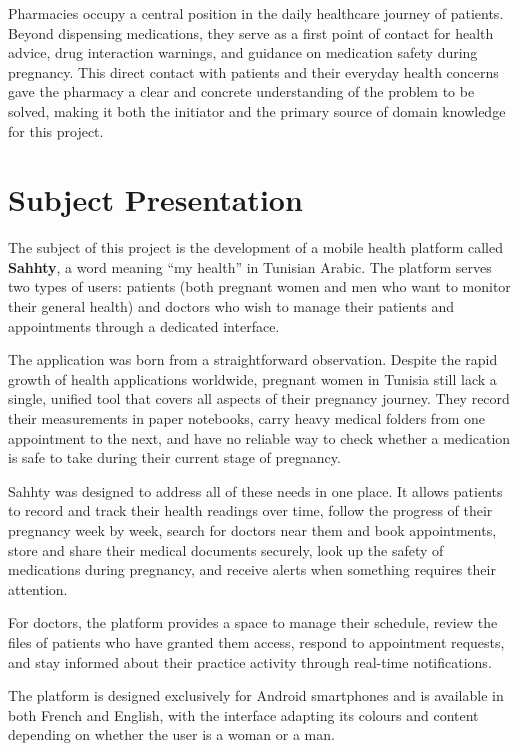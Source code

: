 Pharmacies occupy a central position in the daily healthcare journey of patients. Beyond
dispensing medications, they serve as a first point of contact for health advice, drug
interaction warnings, and guidance on medication safety during pregnancy. This direct
contact with patients and their everyday health concerns gave the pharmacy a clear and
concrete understanding of the problem to be solved, making it both the initiator and the
primary source of domain knowledge for this project.



\section{Subject Presentation}

The subject of this project is the development of a mobile health platform
called \textbf{Sahhty}, a word meaning ``my health'' in Tunisian Arabic. The platform
serves two types of users: patients (both pregnant women and men who want to monitor
their general health) and doctors who wish to manage their patients and appointments
through a dedicated interface.

The application was born from a straightforward observation. Despite the rapid growth of
health applications worldwide, pregnant women in Tunisia still lack a single, unified tool
that covers all aspects of their pregnancy journey. They record their measurements in
paper notebooks, carry heavy medical folders from one appointment to the next, and have
no reliable way to check whether a medication is safe to take during their current stage of
pregnancy.

Sahhty was designed to address all of these needs in one place. It allows patients to record
and track their health readings over time, follow the progress of their pregnancy week by
week, search for doctors near them and book appointments, store and share their medical
documents securely, look up the safety of medications during pregnancy, and receive alerts
when something requires their attention.

For doctors, the platform provides a space to manage their schedule, review the files of
patients who have granted them access, respond to appointment requests, and stay informed
about their practice activity through real-time notifications.

The platform is designed exclusively for Android smartphones and is available in both
French and English, with the interface adapting its colours and content depending on
whether the user is a woman or a man.

